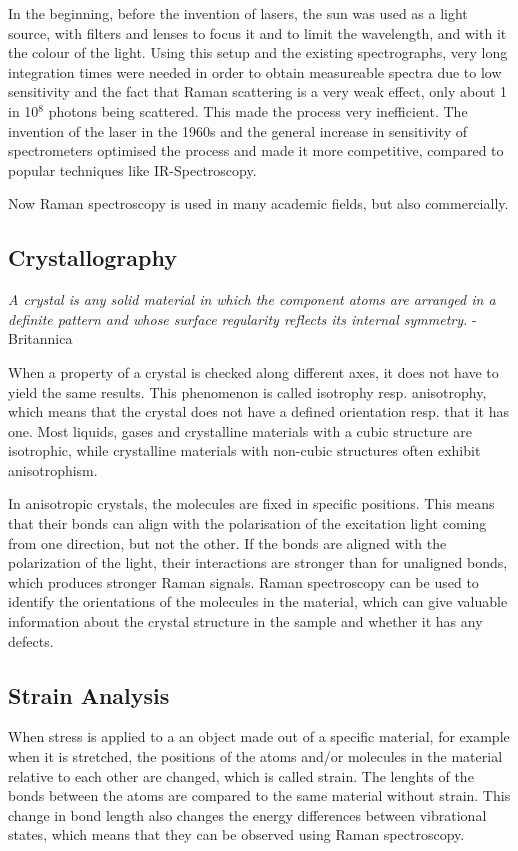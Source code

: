 \bigskip

In the beginning, before the invention of lasers, the sun was used as a light source, with filters and lenses to focus it and to limit the wavelength, and with it the colour of the light. Using this setup and the existing spectrographs, very long integration times were needed in order to obtain measureable  spectra due to low sensitivity and the fact that Raman scattering is a very weak effect, only about 1 in 10\(^8\) photons being scattered. This made the process very inefficient. The invention of the laser in the 1960s and the general increase in sensitivity of spectrometers optimised the process and made it more competitive, compared to popular techniques like IR-Spectroscopy.
\bigskip

Now Raman spectroscopy is used in many academic fields, but also commercially.

\newpage

\subsection{Crystallography}
\textit{A crystal is any solid material in which the component atoms are arranged in a definite pattern and whose surface regularity reflects its internal symmetry.} - Britannica \cite{brittanica}

\bigskip

When a property of a crystal is checked along different axes, it does not have to yield the same results. This phenomenon is called isotrophy resp. anisotrophy, which means that the crystal does not have a defined orientation resp. that it has one. Most liquids, gases and crystalline materials with a cubic structure are isotrophic, while crystalline materials with non-cubic structures often exhibit anisotrophism. 

\bigskip

In anisotropic crystals, the molecules are fixed in specific positions. This means that their bonds can align with the polarisation of the excitation light coming from one direction, but not the other. If the bonds are aligned with the polarization of the light, their interactions are stronger than for unaligned bonds, which produces stronger Raman signals. Raman spectroscopy can be used to identify the orientations of the molecules in the material, which can give valuable information about the crystal structure in the sample and whether it has any defects. 
\cite{RSAA}

\subsection{Strain Analysis}
When stress is applied to a an object made out of a specific material, for example when it is stretched, the positions of the atoms and/or molecules in the material relative to each other are changed, which is called strain. The lenghts of the bonds between the atoms are compared to the same material without strain. This change in bond length also changes the energy differences between vibrational states, which means that they can be observed using Raman spectroscopy.

